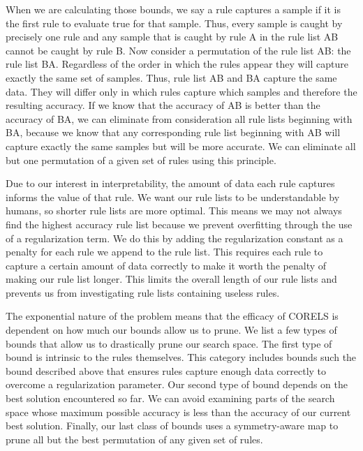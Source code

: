 \documentclass[]{article}
\begin{document}
When we are calculating those bounds, we say a rule captures a sample if it is the first rule to evaluate true for that sample. Thus, every sample is caught by precisely one rule and any sample that is caught by rule A in the rule list AB cannot be caught by rule B. Now consider a permutation of the rule list AB: the rule list BA.  Regardless of the order in which the rules appear they will capture exactly the same set of samples. Thus, rule list AB and BA capture the same data. They will differ only in which rules capture which samples and therefore the resulting accuracy. If we know that the accuracy of AB is better than the accuracy of BA, we can eliminate from consideration all rule lists beginning with BA, because we know that any corresponding rule list beginning with AB will capture exactly the same samples but will be more accurate. We can eliminate all but one permutation of a given set of rules using this principle.

Due to our interest in interpretability, the amount of data each rule captures informs the value of that rule. We want our rule lists to be understandable by humans, so shorter rule lists are more optimal. This means we may not always find the highest accuracy rule list because we prevent overfitting through the use of a regularization term. We do this by adding the regularization constant as a penalty for each rule we append to the rule list. This requires each rule to capture a certain amount of data correctly to make it worth the penalty of making our rule list longer. This limits the overall length of our rule lists and prevents us from investigating rule lists containing useless rules.

The exponential nature of the problem means that the efficacy of CORELS is dependent on how much our bounds allow us to prune. We list a few types of bounds that allow us to drastically prune our search space. The first type of bound is intrinsic to the rules themselves. This category includes bounds such the bound described above that ensures rules capture enough data correctly to overcome a regularization parameter. Our second type of bound depends on the best solution encountered so far. We can avoid examining parts of the search space whose maximum possible accuracy is less than the accuracy of our current best solution. Finally, our last class of bounds uses a symmetry-aware map to prune all but the best permutation of any given set of rules.
\end{document}
